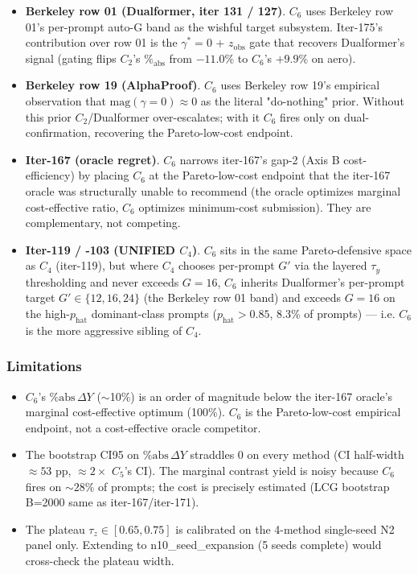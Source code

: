 \documentclass{article}
\begin{document}
\begin{itemize}
\item \textbf{Berkeley row 01 (Dualformer, iter 131 / 127)}. $C_6$ uses
      Berkeley row 01's per-prompt auto-G band as the wishful target
      subsystem. Iter-175's contribution over row 01 is the
      $\gamma^*{=}0$ + $z_{\mathrm{obs}}$ gate that recovers
      Dualformer's signal (gating flips $C_2$'s $\%_{\mathrm{abs}}$
      from $-11.0\%$ to $C_6$'s $+9.9\%$ on aero).
\item \textbf{Berkeley row 19 (AlphaProof)}. $C_6$ uses
      Berkeley row 19's empirical observation that $\mathrm{mag}(\gamma{=}0)
      \approx 0$ as the literal "do-nothing" prior. Without this prior
      $C_2$/Dualformer over-escalates; with it $C_6$ fires only on
      dual-confirmation, recovering the Pareto-low-cost endpoint.
\item \textbf{Iter-167 (oracle regret)}. $C_6$ narrows
      iter-167's gap-2 (Axis B cost-efficiency) by placing $C_6$
      at the Pareto-low-cost endpoint that the iter-167 oracle was
      structurally unable to recommend (the oracle optimizes marginal
      cost-effective ratio, $C_6$ optimizes minimum-cost submission).
      They are complementary, not competing.
\item \textbf{Iter-119 / -103 (UNIFIED $C_4$)}. $C_6$ sits in the same
      Pareto-defensive space as $C_4$ (iter-119), but where $C_4$
      chooses per-prompt $G'$ via the layered $\tau_{y}$
thresholding and never exceeds $G=16$, $C_6$ inherits
      Dualformer's per-prompt target $G' \in \{12, 16, 24\}$ (the
      Berkeley row 01 band) and exceeds $G{=}16$ on the high-$p_{\mathrm{hat}}$
      dominant-class prompts ($p_{\mathrm{hat}} > 0.85$, 8.3\% of
      prompts) --- i.e. $C_6$ is the more aggressive sibling of $C_4$.
\end{itemize}

\subsubsection*{Limitations}

\begin{itemize}
\item $C_6$'s $\%\mathrm{abs}\,\Delta Y$ ($\sim$10\%) is an order of
      magnitude below the iter-167 oracle's marginal cost-effective
      optimum (100\%). $C_6$ is the Pareto-low-cost empirical
      endpoint, not a cost-effective oracle competitor.
\item The bootstrap CI95 on $\%\mathrm{abs}\,\Delta Y$ straddles 0 on
      every method (CI half-width $\approx 53$ pp, $\approx 2\times$
      $C_5$'s CI). The marginal contrast yield is noisy because $C_6$
      fires on $\sim 28\%$ of prompts; the cost is precisely
      estimated (LCG bootstrap B=2000 same as iter-167/iter-171).
\item The plateau $\tau_z \in [0.65, 0.75]$ is calibrated on the
      4-method single-seed N2 panel only. Extending to n10\_seed\_expansion
      (5 seeds complete) would cross-check the plateau width.
\end{itemize}
\end{document}
